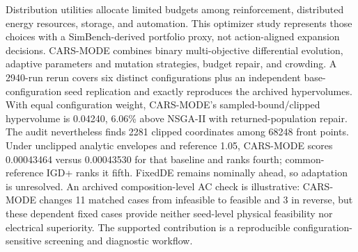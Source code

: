 Distribution utilities allocate limited budgets among reinforcement, distributed energy resources, storage, and automation. This optimizer study represents those choices with a SimBench-derived portfolio proxy, not action-aligned expansion decisions. CARS-MODE combines binary multi-objective differential evolution, adaptive parameters and mutation strategies, budget repair, and crowding. A 2940-run rerun covers six distinct configurations plus an independent base-configuration seed replication and exactly reproduces the archived hypervolumes. With equal configuration weight, CARS-MODE's sampled-bound/clipped hypervolume is 0.04240, 6.06\% above NSGA-II with returned-population repair. The audit nevertheless finds 2281 clipped coordinates among 68248 front points. Under unclipped analytic envelopes and reference 1.05, CARS-MODE scores 0.00043464 versus 0.00043530 for that baseline and ranks fourth; common-reference IGD+ ranks it fifth. FixedDE remains nominally ahead, so adaptation is unresolved. An archived composition-level AC check is illustrative: CARS-MODE changes 11 matched cases from infeasible to feasible and 3 in reverse, but these dependent fixed cases provide neither seed-level physical feasibility nor electrical superiority. The supported contribution is a reproducible configuration-sensitive screening and diagnostic workflow.
